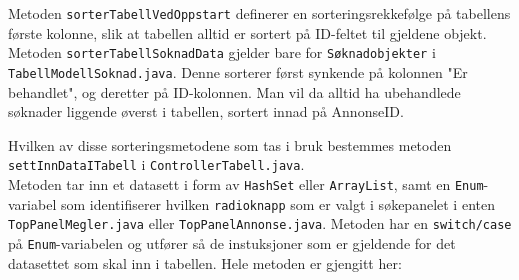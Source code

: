 Metoden \texttt{sorterTabellVedOppstart} definerer en sorteringsrekkefølge på tabellens første kolonne, slik at tabellen alltid er sortert på ID-feltet til gjeldene objekt. \\
Metoden \texttt{sorterTabellSoknadData} gjelder bare for \texttt{Søknadobjekter} i \texttt{TabellModellSoknad.java}. Denne sorterer først synkende på kolonnen "Er behandlet", og deretter på ID-kolonnen. Man vil da alltid ha ubehandlede søknader liggende øverst i tabellen, sortert innad på AnnonseID. 

Hvilken av disse sorteringsmetodene som tas i bruk bestemmes metoden \texttt{settInnDataITabell} i \texttt{ControllerTabell.java}.\\
Metoden tar inn et datasett i form av \texttt{HashSet} eller \texttt{ArrayList}, samt en \texttt{Enum}-variabel som identifiserer hvilken \texttt{radioknapp} som er valgt i søkepanelet i enten \texttt{TopPanelMegler.java} eller \texttt{TopPanelAnnonse.java}. Metoden har en \texttt{switch/case} på \texttt{Enum}-variabelen og utfører så de instuksjoner som er gjeldende for det datasettet som skal inn i tabellen.
Hele metoden er gjengitt her:

